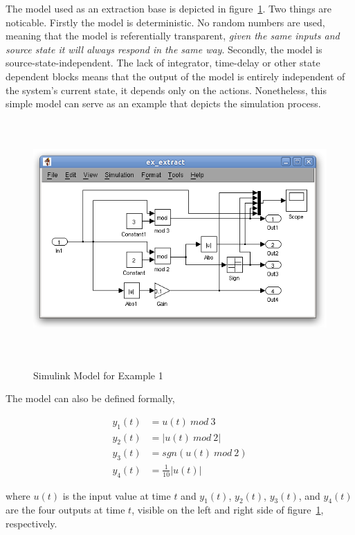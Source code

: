 The model used as an extraction base is depicted in figure~\ref{ioexamplemodel}. Two things are noticable. Firstly the model is deterministic. No random numbers are used, meaning that the model is referentially transparent, \textit{given the same inputs and source state it will always respond in the same way}. Secondly, the model is source-state-independent. The lack of integrator, time-delay or other state dependent blocks means that the output of the model is entirely independent of the system's current state, it depends only on the actions. Nonetheless, this simple model can serve as an example that depicts the simulation process.

\begin{figure}
\begin{center}
\includegraphics[height=9cm]{media/ex_extract.png}\\
\end{center}
\caption{Simulink Model for Example 1}
\label{ioexamplemodel}
\end{figure}

The model can also be defined formally,

\begin{align}
y_1(t) &= u(t)\ mod\ 3 \nonumber \\
y_2(t) &= |u(t)\ mod\ 2| \nonumber \\
y_3(t) &= sgn(u(t)\ mod\ 2) \nonumber \\
y_4(t) &= \frac{1}{10}|u(t)| \nonumber
\end{align}

where $u(t)$ is the input value at time $t$ and $y_1(t)$, $y_2(t)$, $y_3(t)$, and $y_4(t)$ are the four outputs at time $t$, visible on the left and right side of figure~\ref{ioexamplemodel}, respectively.


